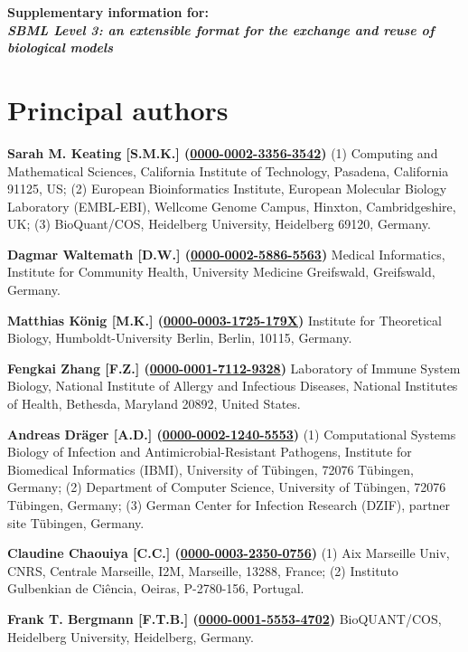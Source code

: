 \documentclass{sbml-paper}
\newcommand{\orcid}[1]{\href{https://orcid.org/#1}{#1}}
\begin{document}
\begin{center}\large\bfseries
Supplementary information for:\\
\emph{SBML Level 3: an extensible format for the exchange and reuse of biological models}
\end{center}

\vspace*{0.25in}

\section{Principal authors}

\textbf{Sarah M. Keating [S.M.K.] (\orcid{0000-0002-3356-3542})} (1) Computing and Mathematical Sciences, California Institute of Technology, Pasadena, California 91125, US; (2) European Bioinformatics Institute, European Molecular Biology Laboratory (EMBL-EBI), Wellcome Genome Campus, Hinxton, Cambridgeshire, UK; (3) BioQuant/COS, Heidelberg University, Heidelberg 69120, Germany.

\textbf{Dagmar Waltemath [D.W.] (\orcid{0000-0002-5886-5563})} Medical Informatics, Institute for Community Health, University Medicine Greifswald, Greifswald, Germany.

\textbf{Matthias K\"{o}nig [M.K.] (\orcid{0000-0003-1725-179X})} Institute for Theoretical Biology, Humboldt-University Berlin, Berlin, 10115, Germany.

\textbf{Fengkai Zhang [F.Z.] (\orcid{0000-0001-7112-9328})} Laboratory of Immune System Biology, National Institute of Allergy and Infectious Diseases, National Institutes of Health, Bethesda, Maryland 20892, United States.

\textbf{Andreas Dräger [A.D.] (\orcid{0000-0002-1240-5553})} (1) Computational Systems Biology of Infection and Antimicrobial-Resistant Pathogens, Institute for Biomedical Informatics (IBMI), University of Tübingen, 72076 Tübingen, Germany; (2) Department of Computer Science, University of Tübingen, 72076 Tübingen, Germany; (3) German Center for Infection Research (DZIF), partner site Tübingen, Germany.

\textbf{Claudine Chaouiya [C.C.] (\orcid{0000-0003-2350-0756})} (1) Aix Marseille Univ, CNRS, Centrale Marseille, I2M, Marseille, 13288, France; (2) Instituto Gulbenkian de Ciência, Oeiras, P-2780-156, Portugal.

\textbf{Frank T. Bergmann [F.T.B.] (\orcid{0000-0001-5553-4702})} BioQUANT/COS, Heidelberg University, Heidelberg, Germany.
\end{document}
